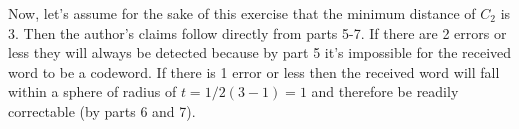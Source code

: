 \documentclass[twoside]{amsart}
\begin{document}
\begin{enumerate}[A.]
      Now, let's assume for the sake of this exercise that the minimum
      distance of $C_2$ is 3. Then the author's claims follow directly
      from parts 5-7. If there are 2 errors or less they will always 
      be detected because by part 5 it's impossible for the received
      word to be a codeword. If there is 1 error or less then the received
      word will fall within a sphere of radius of $t=1/2(3-1)=1$ and therefore
      be readily correctable (by parts 6 and 7).
     

\end{enumerate}
\end{document}
